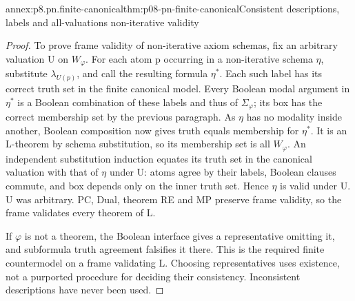 \begin{annexitem}{annex:p8.pn.finite-canonical}{thm:p08-pn-finite-canonical}{Consistent descriptions, labels and all-valuations non-iterative validity}
\begin{proof}
To prove frame validity of non-iterative axiom schemas, fix an
arbitrary valuation U on \(W_\varphi\). For each atom p
occurring in a non-iterative schema \(\eta\), substitute
\(\lambda_{U(p)}\), and call the resulting formula \(\eta^*\).
Each such label has its correct truth set in the finite canonical
model. Every Boolean modal argument in \(\eta^*\) is a
Boolean combination of these labels and thus of
\(\Sigma_\varphi\); its box has the correct membership set
by the previous paragraph. As \(\eta\) has no modality
inside another, Boolean composition now gives truth equals
membership for \(\eta^*\). It is an L-theorem by schema
substitution, so its membership set is all \(W_\varphi\).
An independent substitution induction equates its truth set in
the canonical valuation with that of \(\eta\) under U:
atoms agree by their labels, Boolean clauses commute, and box
depends only on the inner truth set. Hence \(\eta\) is valid
under U. U was arbitrary. PC, Dual, theorem RE and MP preserve
frame validity, so the frame validates every theorem of L.

If \(\varphi\) is not a theorem, the Boolean interface
gives a representative omitting it, and subformula truth
agreement falsifies it there. This is the required finite
countermodel on a frame validating L. Choosing representatives
uses existence, not a purported procedure for deciding their
consistency. Inconsistent descriptions have never been used.
\end{proof}
\end{annexitem}

